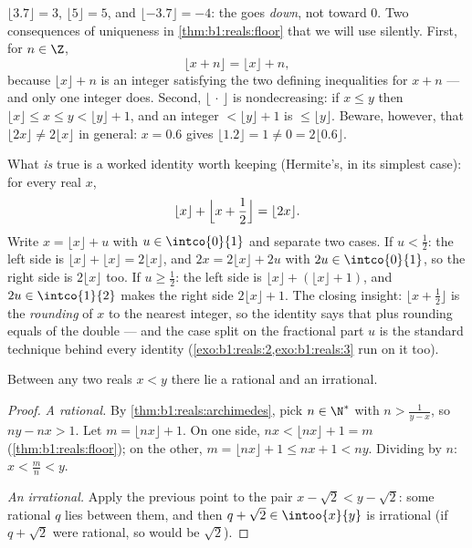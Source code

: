 \begin{example}\label{ex:b1:reals:floorpractice}
$\lfloor 3.7 \rfloor = 3$, $\lfloor 5 \rfloor = 5$, and $\lfloor
-3.7 \rfloor = -4$: the  goes \emph{down}, not toward $0$.
Two consequences of uniqueness in \cref{thm:b1:reals:floor} that
we will use silently. First, for $n \in \Z$,
\[
\lfloor x + n \rfloor = \lfloor x \rfloor + n ,
\]
because $\lfloor x \rfloor + n$ is an integer satisfying the two
defining inequalities for $x + n$ --- and only one integer does.
Second, $\lfloor \, \cdot \, \rfloor$ is nondecreasing: if $x \leq
y$ then $\lfloor x \rfloor \leq x \leq y < \lfloor y \rfloor + 1$,
and an integer $< \lfloor y \rfloor + 1$ is $\leq \lfloor y
\rfloor$. Beware, however, that $\lfloor 2x \rfloor \neq 2\lfloor
x \rfloor$ in general: $x = 0.6$ gives $\lfloor 1.2 \rfloor = 1
\neq 0 = 2\lfloor 0.6 \rfloor$.

What \emph{is} true is a worked identity worth keeping (Hermite's,
in its simplest case): for every real $x$,
\[
\lfloor x \rfloor + \Bigl\lfloor x + \frac12 \Bigr\rfloor
= \lfloor 2x \rfloor .
\]
Write $x = \lfloor x\rfloor + u$ with $u \in \intco{0}{1}$ and
separate two cases. If $u < \frac12$: the left side is $\lfloor
x\rfloor + \lfloor x\rfloor = 2\lfloor x\rfloor$, and $2x =
2\lfloor x\rfloor + 2u$ with $2u \in \intco{0}{1}$, so the right
side is $2\lfloor x\rfloor$ too. If $u \geq \frac12$: the left
side is $\lfloor x\rfloor + (\lfloor x\rfloor + 1)$, and $2u \in
\intco{1}{2}$ makes the right side $2\lfloor x\rfloor + 1$. The
closing insight: $\lfloor x + \frac12\rfloor$ is the
\emph{rounding} of $x$ to the nearest integer, so the identity
says that  plus rounding equals  of the double --- and
the case split on the fractional part $u$ is the standard
technique behind every  identity
(\cref{exo:b1:reals:2,exo:b1:reals:3} run on it too).
\end{example}

\begin{theorem}\label{thm:b1:reals:density}
Between any two reals $x < y$ there lie a rational and an
irrational.
\end{theorem}

\begin{proof}
\emph{A rational.} By \cref{thm:b1:reals:archimedes}, pick $n \in
\N^*$ with $n > \frac{1}{y - x}$, so $ny - nx > 1$. Let $m = \lfloor
nx \rfloor + 1$. On one side, $nx < \lfloor nx \rfloor + 1 = m$
(\cref{thm:b1:reals:floor}); on the other, $m = \lfloor nx \rfloor +
1 \leq nx + 1 < ny$. Dividing by $n$: $x < \frac mn < y$.

\emph{An irrational.} Apply the previous point to the pair $x -
\sqrt 2 < y - \sqrt 2$: some rational $q$ lies between them, and then
$q + \sqrt 2 \in \intoo{x}{y}$ is irrational (if $q + \sqrt 2$ were
rational, so would be $\sqrt 2$).
\end{proof}

